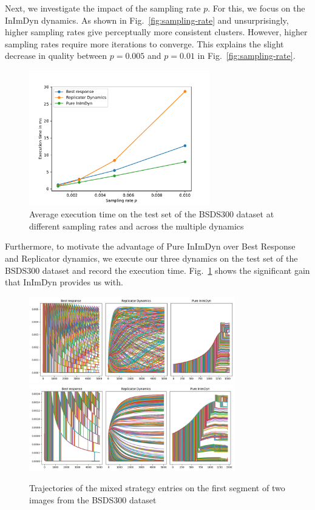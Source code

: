 \documentclass[11pt,a4paper]{article}
\begin{document}
Next, we investigate the impact of the sampling rate $p$. For this, we focus on the InImDyn dynamics. As shown in Fig.~\ref{fig:sampling-rate} and unsurprisingly, higher sampling rates give perceptually more consistent clusters. However, higher sampling rates require more iterations to converge. This explains the slight decrease in quality between $p=0.005$ and $p=0.01$ in Fig.~\ref{fig:sampling-rate}.

\begin{figure}
    \centering
    \includegraphics[width=0.7\textwidth]{figures/execution_time.pdf}
    \caption{Average execution time on the test set of the BSDS300 dataset at different sampling rates and across the multiple dynamics}
    \label{fig:execution-time}
\end{figure}

Furthermore, to motivate the advantage of Pure InImDyn over Best Response and Replicator dynamics, we execute our three dynamics on the test set of the BSDS300 dataset and record the execution time. Fig.~\ref{fig:execution-time} shows the significant gain that InImDyn provides us with.

\begin{figure}
    \centering
    \includegraphics[width=0.8\textwidth]{figures/trajectories/102061.png}
    \includegraphics[width=0.8\textwidth]{figures/trajectories/196073.png}
    \caption{Trajectories of the mixed strategy entries on the first segment of two images from the BSDS300 dataset}
    \label{fig:trajectories}
\end{figure}
\end{document}

